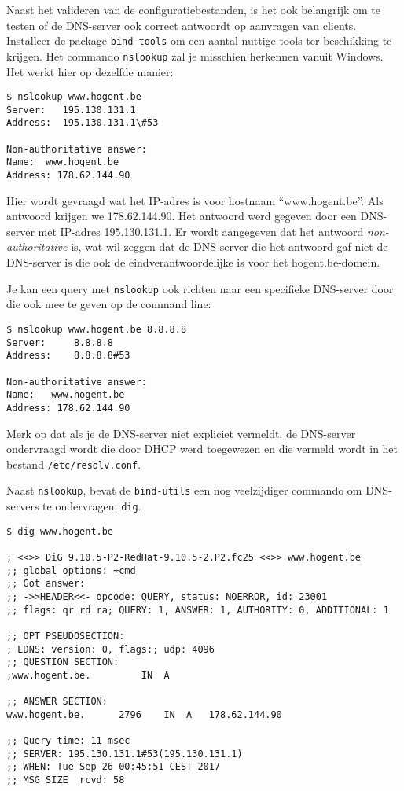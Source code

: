 Naast het valideren van de configuratiebestanden, is het ook belangrijk om te testen of de DNS-server ook correct antwoordt op aanvragen van clients. Installeer de package \texttt{bind-tools} om een aantal nuttige tools ter beschikking te krijgen. Het commando \texttt{nslookup} zal je misschien herkennen vanuit Windows. Het werkt hier op dezelfde manier:

\begin{verbatim}
$ nslookup www.hogent.be
Server:   195.130.131.1
Address:  195.130.131.1\#53

Non-authoritative answer:
Name:  www.hogent.be
Address: 178.62.144.90
\end{verbatim}

Hier wordt gevraagd wat het IP-adres is voor hostnaam ``www.hogent.be''. Als antwoord krijgen we 178.62.144.90. Het antwoord werd gegeven door een DNS-server met IP-adres 195.130.131.1. Er wordt aangegeven dat het antwoord \emph{non-authoritative} is, wat wil zeggen dat de DNS-server die het antwoord gaf niet de DNS-server is die ook de eindverantwoordelijke is voor het hogent.be-domein.

Je kan een query met \texttt{nslookup} ook richten naar een specifieke DNS-server door die ook mee te geven op de command line:

\begin{verbatim}
$ nslookup www.hogent.be 8.8.8.8
Server:		8.8.8.8
Address:	8.8.8.8#53

Non-authoritative answer:
Name:	www.hogent.be
Address: 178.62.144.90
\end{verbatim}

Merk op dat als je de DNS-server niet expliciet vermeldt, de DNS-server ondervraagd wordt die door DHCP werd toegewezen en die vermeld wordt in het bestand \texttt{/etc/resolv.conf}.

Naast \texttt{nslookup}, bevat de \texttt{bind-utils} een nog veelzijdiger commando om DNS-servers te ondervragen: \texttt{dig}.

\begin{verbatim}
$ dig www.hogent.be

; <<>> DiG 9.10.5-P2-RedHat-9.10.5-2.P2.fc25 <<>> www.hogent.be
;; global options: +cmd
;; Got answer:
;; ->>HEADER<<- opcode: QUERY, status: NOERROR, id: 23001
;; flags: qr rd ra; QUERY: 1, ANSWER: 1, AUTHORITY: 0, ADDITIONAL: 1

;; OPT PSEUDOSECTION:
; EDNS: version: 0, flags:; udp: 4096
;; QUESTION SECTION:
;www.hogent.be.			IN	A

;; ANSWER SECTION:
www.hogent.be.		2796	IN	A	178.62.144.90

;; Query time: 11 msec
;; SERVER: 195.130.131.1#53(195.130.131.1)
;; WHEN: Tue Sep 26 00:45:51 CEST 2017
;; MSG SIZE  rcvd: 58
\end{verbatim}

